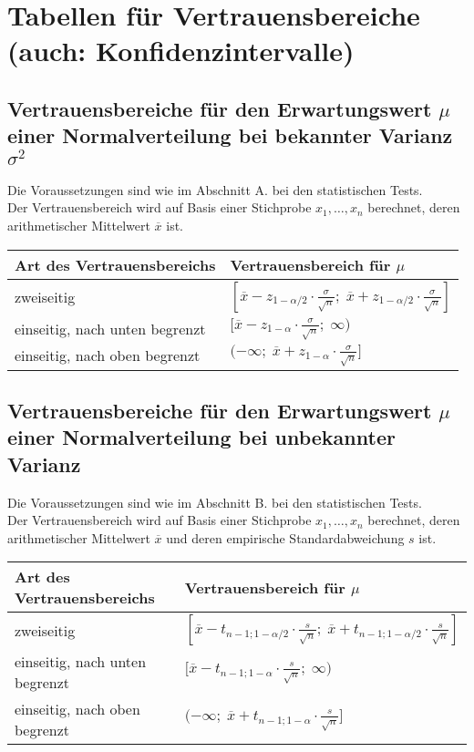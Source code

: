 \section{Tabellen für Vertrauensbereiche (auch: Konfidenzintervalle)}

\subsection{Vertrauensbereiche für den Erwartungswert $\mu$ einer Normalverteilung bei bekannter Varianz $\sigma^2$}

Die Voraussetzungen sind wie im Abschnitt A. bei den statistischen Tests.\\

Der Vertrauensbereich wird auf Basis einer Stichprobe $x_1, \ldots , x_n$ berechnet, deren arithmetischer Mittelwert $\overline x$ ist.\\

\begin{tabular}{ll} 
Art des Vertrauensbereichs & Vertrauensbereich für $\mu$ \\
	\toprule
zweiseitig & $[\overline x - z_{1-\alpha /2} \cdot \frac{\sigma}{\sqrt{n}} ; \;
\overline x + z_{1-\alpha /2} \cdot \frac{\sigma}{\sqrt{n}}]$ \\
einseitig, nach unten begrenzt & $[\overline x - z_{1-\alpha} \cdot \frac{\sigma}{\sqrt{n}} ; \;
\infty)$ \\
einseitig, nach oben begrenzt & $(-\infty ; \; \overline x + z_{1-\alpha} \cdot \frac{\sigma}{\sqrt{n}}]$ 
\end{tabular}

\subsection{Vertrauensbereiche für den Erwartungswert $\mu$ einer Normalverteilung bei unbekannter Varianz}

Die Voraussetzungen sind wie im Abschnitt B. bei den statistischen Tests.\\

Der Vertrauensbereich wird auf Basis einer Stichprobe $x_1, \ldots , x_n$ berechnet, deren arithmetischer Mittelwert $\overline x$ und deren empirische Standardabweichung $s$ ist.\\

\begin{tabular}{ll}
Art des Vertrauensbereichs & Vertrauensbereich für $\mu$ \\
	\toprule
zweiseitig & $[\overline x - t_{n-1;1-\alpha /2} \cdot \frac{s}{\sqrt{n}} ; \;
\overline x + t_{n-1;1-\alpha /2} \cdot \frac{s}{\sqrt{n}}]$ \\
einseitig, nach unten begrenzt & $[\overline x - t_{n-1;1-\alpha} \cdot \frac{s}{\sqrt{n}} ; \;
\infty)$ \\
einseitig, nach oben begrenzt & $(-\infty ; \;
\overline x + t_{n-1;1-\alpha} \cdot \frac{s}{\sqrt{n}}]$ 
\end{tabular}


